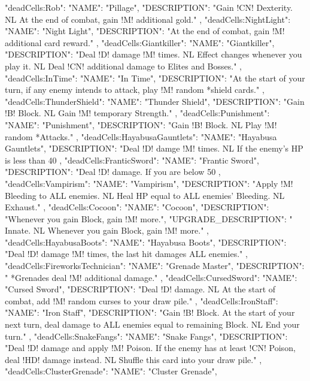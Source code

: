 {
  "deadCells:Rob": {
    "NAME": "Pillage",
    "DESCRIPTION": "Gain !CN! Dexterity. NL At the end of combat, gain !M! additional gold."
  },
  "deadCells:NightLight": {
    "NAME": "Night Light",
    "DESCRIPTION": "At the end of combat, gain !M! additional card reward."
  },
  "deadCells:Giantkiller": {
    "NAME": "Giantkiller",
    "DESCRIPTION": "Deal !D! damage !M! times. NL Effect changes whenever you play it. NL Deal !CN! additional damage to Elites and Bosses."
  },
  "deadCells:InTime": {
    "NAME": "In Time",
    "DESCRIPTION": "At the start of your turn, if any enemy intends to attack, play !M! random *shield cards."
  },
  "deadCells:ThunderShield": {
    "NAME": "Thunder Shield",
    "DESCRIPTION": "Gain !B! Block. NL Gain !M! temporary Strength."
  },
  "deadCells:Punishment": {
    "NAME": "Punishment",
    "DESCRIPTION": "Gain !B! Block. NL Play !M! random *Attacks."
  },
  "deadCells:HayabusaGauntlets": {
    "NAME": "Hayabusa Gauntlets",
    "DESCRIPTION": "Deal !D! damge !M! times. NL If the enemy's HP is less than 40%
  },
  "deadCells:FranticSword": {
    "NAME": "Frantic Sword",
    "DESCRIPTION": "Deal !D! damage. If you are below 50%
  },
  "deadCells:Vampirism": {
    "NAME": "Vampirism",
    "DESCRIPTION": "Apply !M! Bleeding to ALL enemies. NL Heal HP equal to ALL enemies' Bleeding. NL Exhaust."
  },
  "deadCells:Cocoon": {
    "NAME": "Cocoon",
    "DESCRIPTION": "Whenever you gain Block, gain !M! more.",
    "UPGRADE_DESCRIPTION": " Innate. NL Whenever you gain Block, gain !M! more."
  },
  "deadCells:HayabusaBoots": {
    "NAME": "Hayabusa Boots",
    "DESCRIPTION": "Deal !D! damage !M! times, the last hit damages ALL enemies."
  },
  "deadCells:FireworksTechnician": {
    "NAME": "Grenade Master",
    "DESCRIPTION": " *Grenades deal !M! additional damage."
  },
  "deadCells:CursedSword": {
    "NAME": "Cursed Sword",
    "DESCRIPTION": "Deal !D! damage. NL At the start of combat, add !M! random curses to your draw pile."
  },
  "deadCells:IronStaff": {
    "NAME": "Iron Staff",
    "DESCRIPTION": "Gain !B! Block. At the start of your next turn, deal damage to ALL enemies equal to remaining Block. NL End your turn."
  },
  "deadCells:SnakeFangs": {
    "NAME": "Snake Fangs",
    "DESCRIPTION": "Deal !D! damage and apply !M! Poison. If the enemy has at least !CN! Poison, deal !HD! damage instead. NL Shuffle this card into your draw pile."
  },
  "deadCells:ClusterGrenade": {
    "NAME": "Cluster Grenade",
}}
